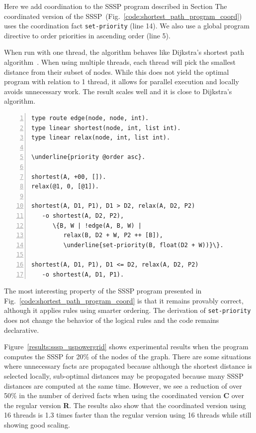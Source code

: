 Here we add coordination to the SSSP program described in Section
The coordinated version of the
SSSP~(Fig.~\ref{code:shortest_path_program_coord}) uses the coordination fact
\texttt{set-priority} (line 14). We also use a global program directive to order
priorities in ascending order (line 5).

When run with one thread, the algorithm behaves like
Dijkstra's shortest path algorithm~\cite{Dijkstra}. When using multiple
threads, each thread will pick the smallest distance from their subset of nodes.
While this does not yield the optimal program with relation to 1 thread, it
allows for parallel execution and locally avoids unnecessary work. The result
scales well and it is close to Dijkstra's algorithm.

\begin{topfig}
\scriptsize\begin{Verbatim}[numbers=left,commandchars=\\\{\}]
type route edge(node, node, int).
type linear shortest(node, int, list int).
type linear relax(node, int, list int).

\underline{priority @order asc}.

shortest(A, +00, []).
relax(@1, 0, [@1]).

shortest(A, D1, P1), D1 > D2, relax(A, D2, P2)
   -o shortest(A, D2, P2),
      \{B, W | !edge(A, B, W) |
         relax(B, D2 + W, P2 ++ [B]),
         \underline{set-priority(B, float(D2 + W))}\}.

shortest(A, D1, P1), D1 <= D2, relax(A, D2, P2)
   -o shortest(A, D1, P1).
\end{Verbatim}
\end{topfig}
\normalsize

The most interesting property of the SSSP program presented in
Fig.~\ref{code:shortest_path_program_coord} is that it remains provably correct,
although it applies rules using smarter ordering. The derivation of
\texttt{set-priority} does not change the behavior of the logical rules and the
code remains declarative.

Figure~\ref{results:sssp_uspowergrid} shows experimental results when the
program computes the SSSP for 20\% of the nodes of the graph.
There are some situations where unnecessary facts are propagated
because although the shortest distance is selected locally, sub-optimal distances may be
propagated because many SSSP distances are computed at the same time.
However, we see a reduction of over 50\% in the number of
derived facts when using the coordinated version \textbf{C} over the regular
version \textbf{R}. The results also show that the coordinated
version using 16 threads is 1.3 times faster than the regular version using 16
threads while still showing good scaling.

